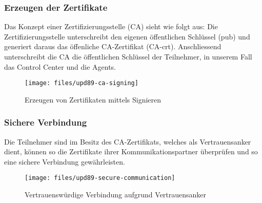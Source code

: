 \subsubsection*{Erzeugen der Zertifikate}
Das Konzept einer Zertifizierungsstelle (CA) sieht wie folgt aus: Die Zertifizierungsstelle unterschreibt den eigenen öffentlichen Schlüssel (pub) und generiert daraus das öffenliche CA-Zertifikat (CA-crt). Anschliessend unterschreibt die CA die öffentlichen Schlüssel der Teilnehmer, in unserem Fall das Control Center und die Agents.

\begin{figure}
  \centering
    \texttt{[image: files/upd89-ca-signing]}
  \caption{Erzeugen von Zertifikaten mittels Signieren}
  \label{fig:sec-signin}
\end{figure}

\clearpage
\subsubsection*{Sichere Verbindung}

Die Teilnehmer sind im Besitz des CA-Zertifikats, welches als Vertrauensanker dient, können so die Zertifikate ihrer Kommunikationspartner überprüfen und so eine sichere Verbindung gewährleisten.


\begin{figure}
  \centering
    \texttt{[image: files/upd89-secure-communication]}
  \caption{Vertrauenswürdige Verbindung aufgrund Vertrauensanker}
  \label{fig:sec-connection}
\end{figure}

